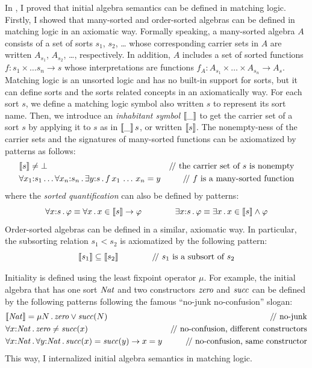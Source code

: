 \documentclass[11pt]{article}
\begin{document}
In \cite{CLR20}, I proved that initial algebra semantics can be defined in 
matching logic. 
Firstly, I showed that many-sorted and order-sorted algebras can be defined in 
matching logic in an axiomatic way. 
Formally speaking, a many-sorted algebra $A$
consists of a set of sorts $s_1$, $s_2$, \dots 
whose corresponding carrier sets in $A$ are written
$A_{s_1}$, $A_{s_2}$, \dots, respectively.
In addition, $A$ includes a set of sorted functions
$f \colon s_1 \times \dots s_n \to s$ whose interpretations
are functions $f_A \colon A_{s_1} \times \dots \times A_{s_n} \to A_s$. 
Matching logic is an unsorted logic and has no built-in support for sorts, but 
it can define sorts and the sorts related concepts in an axiomatically way. 
For each sort $s$, we define a matching logic symbol also written $s$ to 
represent its sort name. 
Then, we introduce an \emph{inhabitant symbol} $\llbracket \_ \rrbracket$ to get the carrier 
set of a sort $s$ by applying it to $s$
as in $\llbracket \_ \rrbracket\,s$, or written $\llbracket s \rrbracket$. 
The nonempty-ness of the carrier sets and the signatures of many-sorted 
functions can be axiomatized by patterns as follows:
\begin{align*}
& \inh{s} \neq \bot & \text{\Slash the carrier set of $s$ is nonempty} \\
& \forall x_1 \cln s_1 \dots \forall x_n \cln s_n \ld \exists y \cln s \ld
f \, x_1 \, \dots \, x_n = y
& \text{\Slash $f$ is a many-sorted function}
\end{align*}
where the \emph{sorted quantification} can also be defined by patterns:
$$
\forall x {:} s \,.\, \varphi \equiv \forall x \,.\, x \in \llbracket s \rrbracket \to \varphi
\qquad\qquad \exists x {:} s \,.\, \varphi \equiv \exists x \,.\, x \in \llbracket s \rrbracket 
\land \varphi
$$
Order-sorted algebras can be defined in a similar, axiomatic way. 
In particular, the subsorting relation $s_1 < s_2$ is axiomatized by
the following pattern:
$$
\inh{s_1} \subseteq \inh{s_2} \qquad\qquad \text{\Slash $s_1$ is a subsort of 
$s_2$}
$$

Initiality is defined using the least fixpoint operator $\mu$. 
For example, the initial algebra that has one sort $\mathit{Nat}$
and two constructors $\mathit{zero}$ and $\mathit{succ}$ can be defined by the following patterns
following the famous ``no-junk no-confusion'' slogan:
\begin{align*}
& \inh{\Nat} = \mu N \ld \zero \vee \suc(N) & \text{\Slash no-junk}\\
& \forall x \cln \Nat \ld \zero \neq \suc(x) & \text{\Slash no-confusion, 
different constructors}\\
& \forall x \cln \Nat \ld \forall y \cln \Nat \ld 
\suc(x) = \suc(y) \imp x = y
& \text{\Slash no-confusion, same constructor}
\end{align*}
This way, I internalized initial algebra semantics in matching logic.
\end{document}
